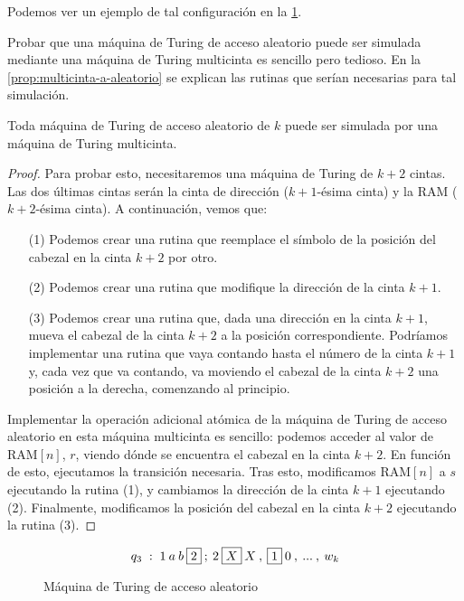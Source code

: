 Podemos ver un ejemplo de tal configuración en la \cref{fig:maquina-turing-aleatorio}.

Probar que una máquina de Turing de acceso aleatorio puede ser simulada mediante una máquina de Turing multicinta es sencillo pero tedioso. En la \cref{prop:multicinta-a-aleatorio} se explican las rutinas que serían necesarias para tal simulación.

\begin{proposicion}\label{prop:multicinta-a-aleatorio}
Toda máquina de Turing de acceso aleatorio de $k$ puede ser simulada por una máquina de Turing multicinta.
\end{proposicion}
\begin{proof}
Para probar esto, necesitaremos una máquina de Turing de $k+2$ cintas. Las dos últimas cintas serán la cinta de dirección ($k+1$-ésima cinta) y la RAM ($k+2$-ésima cinta). A continuación, vemos que:

\begin{itemize}
    \item[(1)] Podemos crear una rutina que reemplace el símbolo de la posición del cabezal en la cinta $k+2$ por otro.
    \item[(2)] Podemos crear una rutina que modifique la dirección de la cinta $k+1$.
    \item[(3)] Podemos crear una rutina que, dada una dirección en la cinta $k+1$, mueva el cabezal de la cinta $k+2$ a la posición correspondiente. Podríamos implementar una rutina que vaya contando hasta el número de la cinta $k+1$ y, cada vez que va contando, va moviendo el cabezal de la cinta $k+2$ una posición a la derecha, comenzando al principio.
\end{itemize}
Implementar la operación adicional atómica de la máquina de Turing de acceso aleatorio en esta máquina multicinta es sencillo: podemos acceder al valor de $\text{RAM}[n]$, $r$, viendo dónde se encuentra el cabezal en la cinta $k+2$. En función de esto, ejecutamos la transición necesaria. Tras esto, modificamos $\text{RAM}[n]$ a $s$ ejecutando la rutina (1), y cambiamos la dirección de la cinta $k+1$ ejecutando (2). Finalmente, modificamos la posición del cabezal en la cinta $k+2$ ejecutando la rutina (3). 
\end{proof}

\begin{figure}[H]
\centering
$$q_3\;:\;1\:a\:b\:\fbox{$2$}\:;\:2\:\fbox{$X$}\:X\:,\:\fbox{$1$}\:0\:,\:...\:,\:w_k$$

\caption{Máquina de Turing de acceso aleatorio}
\label{fig:maquina-turing-aleatorio}
\end{figure}

